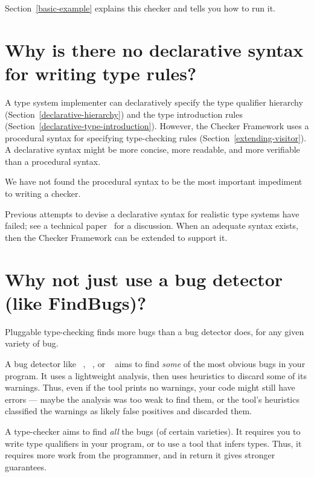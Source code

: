 Section~\ref{basic-example} explains this checker and tells
you how to run it.


\section{Why is there no declarative syntax for writing type rules?\label{faq-declarative-syntax-for-type-rules}}

A type system implementer can declaratively specify the type qualifier
hierarchy (Section~\ref{declarative-hierarchy}) and the type introduction rules
(Section~\ref{declarative-type-introduction}).  However, the Checker
Framework uses a procedural syntax for specifying type-checking
rules (Section~\ref{extending-visitor}).
A declarative syntax might be more concise, more readable, and more
verifiable than a procedural syntax.

We have not found the procedural syntax to be the most important impediment
to writing a checker.

Previous attempts to devise a declarative syntax 
for realistic type systems have failed; see a technical
paper~\cite{PapiACPE2008} for a discussion.  When an
adequate syntax exists, then the Checker Framework can be extended to
support it.


\section{Why not just use a bug detector (like FindBugs)?\label{faq-type-checking-vs-bug-detectors}}

Pluggable type-checking finds more bugs than a bug detector does, for any
given variety of bug.

A bug detector like ~\cite{HovemeyerP2004,HovemeyerSP2005},
~\cite{Artho2001}, or
~\cite{Copeland2005} aims to find \emph{some}
of the most obvious bugs in your program.  It uses a lightweight analysis,
then uses heuristics to discard some of its warnings.  Thus, even if the tool
prints no warnings, your code might still have errors --- maybe the
analysis was too weak to find them, or the tool's heuristics classified the
warnings as likely false positives and discarded them.

A type-checker aims to find \emph{all} the bugs (of certain varieties).
It requires you to write type qualifiers in your program, or to use a tool
that infers types.  Thus, it requires more work from the programmer, and in
return it gives stronger guarantees.


